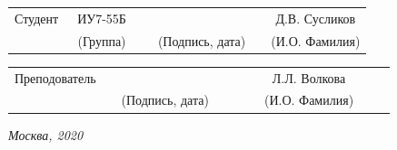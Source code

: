 \documentclass[14pt, a4paper]{extarticle}
\begin{document}
	
	\noindent
	\\
	
	\noindent
	\\
	
	\vspace{1.5cm}
	\noindent
	\begin{tabular}{l c c c c c}
		Студент      & ~ИУ7-55Б~               & \hspace{2.5cm} & \hspace{2cm}                 & &  Д.В. Сусликов \\\cline{2-2}\cline{4-4} \cline{6-6} 
		\hspace{3cm} & {\footnotesize(Группа)} &                & {\footnotesize(Подпись, дата)} & & {\footnotesize(И.О. Фамилия)}
	\end{tabular}
	
	\noindent
	\begin{tabular}{l c c c c}
		Преподователь & \hspace{5cm}   & \hspace{2cm}                 & & ~~~~~~Л.Л. Волкова~~~~~~\\\cline{3-3} \cline{5-5} 
		\hspace{3cm}  &                & {\footnotesize(Подпись, дата)} & & {\footnotesize(И.О. Фамилия)}
	\end{tabular}
	
	\vspace{0.6cm}
	\begin{center}	
		\vfill
		\large \textit {Москва, 2020}
	\end{center}
	
	\thispagestyle {empty}
	\pagebreak
	
	\clearpage
	\tableofcontents
	
	\clearpage
\end{document}

